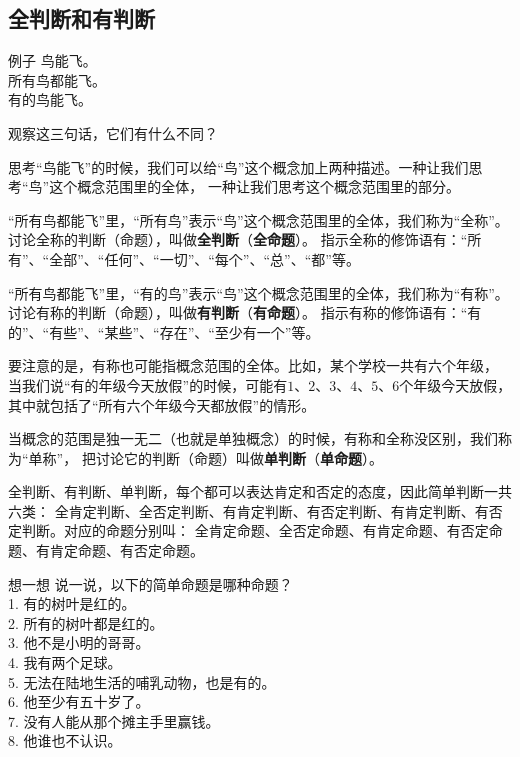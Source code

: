 \documentclass[12pt,UTF8,a4paper]{article}
\begin{document}
\subsection{全判断和有判断}

\begin{blockin}{例子}
    鸟能飞。\\
    所有鸟都能飞。\\
    有的鸟能飞。
\end{blockin}

观察这三句话，它们有什么不同？

思考“鸟能飞”的时候，我们可以给“鸟”这个概念加上两种描述。一种让我们思考“鸟”这个概念范围里的全体，
一种让我们思考这个概念范围里的部分。

“所有鸟都能飞”里，“所有鸟”表示“鸟”这个概念范围里的全体，我们称为“全称”。
讨论全称的判断（命题），叫做\textbf{全判断}（\textbf{全命题}）。
指示全称的修饰语有：“所有”、“全部”、“任何”、“一切”、“每个”、“总”、“都”等。

“所有鸟都能飞”里，“有的鸟”表示“鸟”这个概念范围里的全体，我们称为“有称”。
讨论有称的判断（命题），叫做\textbf{有判断}（\textbf{有命题}）。
指示有称的修饰语有：“有的”、“有些”、“某些”、“存在”、“至少有一个”等。

要注意的是，有称也可能指概念范围的全体。比如，某个学校一共有六个年级，
当我们说“有的年级今天放假”的时候，可能有$1$、$2$、$3$、$4$、$5$、$6$个年级今天放假，
其中就包括了“所有六个年级今天都放假”的情形。

当概念的范围是独一无二（也就是单独概念）的时候，有称和全称没区别，我们称为“单称”，
把讨论它的判断（命题）叫做\textbf{单判断}（\textbf{单命题}）。

全判断、有判断、单判断，每个都可以表达肯定和否定的态度，因此简单判断一共六类：
全肯定判断、全否定判断、有肯定判断、有否定判断、有肯定判断、有否定判断。对应的命题分别叫：
全肯定命题、全否定命题、有肯定命题、有否定命题、有肯定命题、有否定命题。


\begin{blockaft}{想一想}
    说一说，以下的简单命题是哪种命题？\\
    1. 有的树叶是红的。 \\
    2. 所有的树叶都是红的。\\
    3. 他不是小明的哥哥。\\
    4. 我有两个足球。 \\
    5. 无法在陆地生活的哺乳动物，也是有的。\\
    6. 他至少有五十岁了。\\
    7. 没有人能从那个摊主手里赢钱。 \\
    8. 他谁也不认识。
\end{blockaft}
\end{document}
